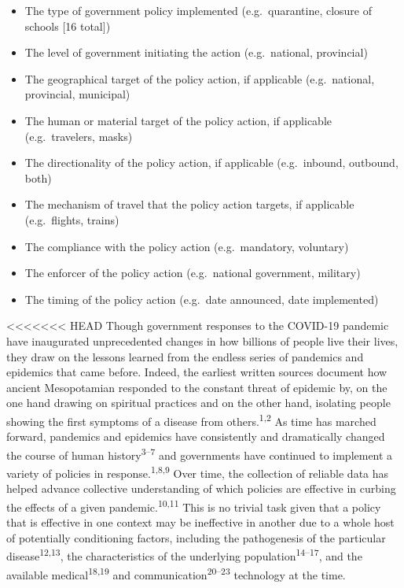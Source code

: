 \documentclass[]{article}
\providecommand{\tightlist}{%
  \setlength{\itemsep}{0pt}\setlength{\parskip}{0pt}}
\begin{document}
\begin{itemize}
\tightlist
\item
  The type of government policy implemented (e.g.~quarantine, closure of schools {[}16 total{]})
\item
  The level of government initiating the action (e.g.~national, provincial)
\item
  The geographical target of the policy action, if applicable (e.g.~national, provincial, municipal)
\item
  The human or material target of the policy action, if applicable (e.g.~travelers, masks)
\item
  The directionality of the policy action, if applicable (e.g.~inbound, outbound, both)
\item
  The mechanism of travel that the policy action targets, if applicable (e.g.~flights, trains)
\item
  The compliance with the policy action (e.g.~mandatory, voluntary)
\item
  The enforcer of the policy action (e.g.~national government, military)
\item
  The timing of the policy action (e.g.~date announced, date implemented)
\end{itemize}

<<<<<<< HEAD
Though government responses to the COVID-19 pandemic have inaugurated unprecedented changes in how billions of people live their lives, they draw on the lessons learned from the endless series of pandemics and epidemics that came before. Indeed, the earliest written sources document how ancient Mesopotamian responded to the constant threat of epidemic by, on the one hand drawing on spiritual practices and on the other hand, isolating people showing the first symptoms of a disease from others.\textsuperscript{1,2} As time has marched forward, pandemics and epidemics have consistently and dramatically changed the course of human history\textsuperscript{3--7} and governments have continued to implement a variety of policies in response.\textsuperscript{1,8,9} Over time, the collection of reliable data has helped advance collective understanding of which policies are effective in curbing the effects of a given pandemic.\textsuperscript{10,11} This is no trivial task given that a policy that is effective in one context may be ineffective in another due to a whole host of potentially conditioning factors, including the pathogenesis of the particular disease\textsuperscript{12,13}, the characteristics of the underlying population\textsuperscript{14--17}, and the available medical\textsuperscript{18,19} and communication\textsuperscript{20--23} technology at the time.
\end{document}
